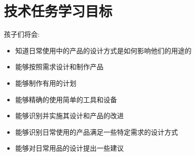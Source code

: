 \chapter{技术任务学习目标}

孩子们将会:\par
  \begin{itemize}
    \item 知道日常使用中的产品的设计方式是如何影响他们的用途的
    \item 能够按照需求设计和制作产品
    \item 能够制作有用的计划
    \item 能够精确的使用简单的工具和设备
    \item 能够识别并实施其设计和产品的改进
    \item 能够识别日常使用的产品满足一些特定需求的设计方式
    \item 能够对日常用品的设计提出一些建议
  \end{itemize}  
